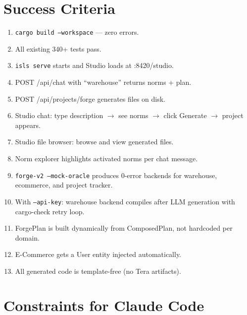 \documentclass[11pt,a4paper]{article}
\begin{document}
\section{Success Criteria}

\begin{enumerate}
\item \texttt{cargo build --workspace} --- zero errors.
\item All existing 340+ tests pass.
\item \texttt{isls serve} starts and Studio loads at :8420/studio.
\item POST /api/chat with ``warehouse'' returns norms + plan.
\item POST /api/projects/forge generates files on disk.
\item Studio chat: type description $\to$ see norms $\to$ click Generate
  $\to$ project appears.
\item Studio file browser: browse and view generated files.
\item Norm explorer highlights activated norms per chat message.
\item \texttt{forge-v2 --mock-oracle} produces 0-error backends for
  warehouse, ecommerce, and project tracker.
\item With \texttt{--api-key}: warehouse backend compiles after
  LLM generation with cargo-check retry loop.
\item ForgePlan is built dynamically from ComposedPlan, not
  hardcoded per domain.
\item E-Commerce gets a User entity injected automatically.
\item All generated code is template-free (no Tera artifacts).
\end{enumerate}

\section{Constraints for Claude Code}
\end{document}
